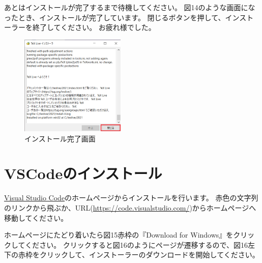 \documentclass[dvipdfmx]{jsarticle}
\begin{document}
あとはインストールが完了するまで待機してください。
図14のような画面になったとき、インストールが完了しています。
閉じるボタンを押して、インストーラーを終了してください。
お疲れ様でした。

\begin{figure}[H]
    \centering
    \includegraphics[width=5cm]{images/TeXLive2021_8.png}
    \caption{インストール完了画面}
\end{figure}


\section{VSCodeのインストール}

\href{https://code.visualstudio.com/}{Visual Studio Code}のホームページからインストールを行います。
赤色の文字列のリンクから飛ぶか、URL(\href{https://code.visualstudio.com/}{https://code.visualstudio.com/})からホームページへ移動してください。

ホームページにたどり着いたら図15赤枠の『Download for Windows』をクリックしてください。
クリックすると図16のようにページが遷移するので、図16左下の赤枠をクリックして、インストーラーのダウンロードを開始してください。
\end{document}
